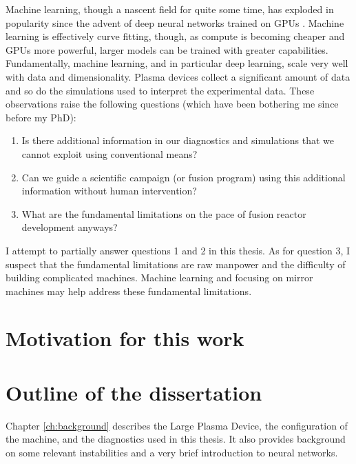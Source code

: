 Machine learning, though a nascent field for quite some time, has exploded in popularity since the advent of deep neural networks trained on GPUs \cite{krizhevsky_imagenet_2017}. Machine learning is effectively curve fitting, though, as compute is becoming cheaper and GPUs more powerful, larger models can be trained with greater capabilities. Fundamentally, machine learning, and in particular deep learning, scale very well with data and dimensionality. Plasma devices collect a significant amount of data and so do the simulations used to interpret the experimental data. These observations raise the following questions (which have been bothering me since before my PhD): 
\begin{enumerate}
	\item Is there additional information in our diagnostics and simulations that we cannot exploit using conventional means?
	\item Can we guide a scientific campaign (or fusion program) using this additional information without human intervention?
	\item What are the fundamental limitations on the pace of fusion reactor development anyways?
\end{enumerate}

I attempt to partially answer questions 1 and 2 in this thesis. As for question 3, I suspect that the fundamental limitations are raw manpower and the difficulty of building complicated machines. Machine learning and focusing on mirror machines may help address these fundamental limitations.


\section{Motivation for this work}

\section{Outline of the dissertation}
Chapter \ref{ch:background} describes the Large Plasma Device, the configuration of the machine, and the diagnostics used in this thesis. It also provides background on some relevant instabilities and a very brief introduction to neural networks. 

